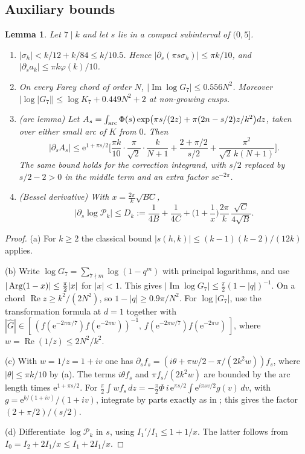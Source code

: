 \documentclass[11pt]{amsart}
\newtheorem{lemma}[theorem]{Lemma}
\theoremstyle{remark}
\newcommand{\Rea}{\operatorname{Re}}\newcommand{\Ima}{\operatorname{Im}}
\newcommand{\cP}{\mathcal P}\newcommand{\cE}{\mathcal E}\newcommand{\e}{\mathrm e}
\begin{document}
\subsection{Auxiliary bounds}
\begin{lemma}\label{lem:aux}
Let $7\mid k$ and let $s$ lie in a compact subinterval of $(0,5]$.
\begin{enumerate}[label=(\alph*),leftmargin=2em]
\item $|\sigma_h|<k/12+k/84\le k/10.5$. Hence $|\partial_s(\pi s\sigma_h)|\le\pi k/10$, and $|\partial_s a_k|\le\pi k\varphi(k)/10$.
\item On every Farey chord of order $N$, $|\Ima\log G_7|\le0.556N^2$. Moreover $|\log|G_7||\le\log K_7+0.449N^2+2$ at non-growing cusps.
\item \emph{(arc lemma)} Let $A_s=\int_{\rm arc}\Phi(s)\exp\!\big(\pi s/(2z)+\pi(2n-s/2)z/k^2\big)dz$, taken over either small arc of $K$ from $0$. Then
\[
|\partial_sA_s|\le\e^{1+\pi s/2}\Big[\frac{\pi k}{10}\cdot\frac{\pi}{\sqrt2}\cdot\frac{k}{N+1}+\frac{2+\pi/2}{s/2}+\frac{\pi^2}{\sqrt2\,k(N+1)}\Big].
\]
The same bound holds for the correction integrand, with $s/2$ replaced by $s/2-2>0$ in the middle term and an extra factor $s\e^{-2\pi}$.
\item \emph{(Bessel derivative)} With $x=\frac{2\pi}k\sqrt{BC}$,
\[
|\partial_s\log\cP_k|\le D_k:=\frac1{4B}+\frac1{4C}+\Big(1+\frac1x\Big)\frac{2\pi}k\,\frac{\sqrt C}{4\sqrt B}.
\]
\end{enumerate}
\end{lemma}
\begin{proof}
(a) For $k\ge2$ the classical bound $|s(h,k)|\le(k-1)(k-2)/(12k)$ applies.

(b) Write $\log G_7=\sum_{7\nmid m}\log(1-q^m)$ with principal logarithms, and use $|\operatorname{Arg}(1-x)|\le\frac\pi2|x|$ for $|x|<1$. This gives $|\Ima\log G_7|\le\frac\pi2(1-|q|)^{-1}$. On a chord $\Rea z\ge k^2/(2N^2)$, so $1-|q|\ge0.9\pi/N^2$. For $\log|G_7|$, use the transformation formula at $d=1$ together with $|\widehat G|\in[\,(f(\e^{-2\pi w/7})f(\e^{-2\pi w}))^{-1},\,f(\e^{-2\pi w/7})f(\e^{-2\pi w})\,]$, where $w=\Rea(1/z)\le2N^2/k^2$.

(c) With $w=1/z=1+iv$ one has $\partial_sf_s=(i\theta+\pi w/2-\pi/(2k^2w))f_s$, where $|\theta|\le\pi k/10$ by (a). The terms $i\theta f_s$ and $\pi f_s/(2k^2w)$ are bounded by the arc length times $\e^{1+\pi s/2}$. For $\frac\pi2\int wf_s\,dz=-\frac{\pi}2\Phi\,i\,\e^{\pi s/2}\int\e^{i\pi sv/2}g(v)\,dv$, with $g=\e^{b/(1+iv)}/(1+iv)$, integrate by parts exactly as in \cite[Lemma 7.2]{P1}; this gives the factor $(2+\pi/2)/(s/2)$.

(d) Differentiate $\log\cP_k$ in $s$, using $I_1'/I_1\le1+1/x$. The latter follows from $I_0=I_2+2I_1/x\le I_1+2I_1/x$.
\end{proof}
\end{document}
